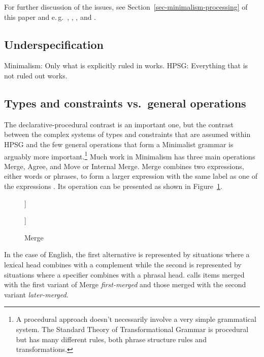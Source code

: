 \documentclass[output=paper]{langsci/langscibook}
\begin{document}
For further discussion of the issues, see Section~\ref{sec-minimalism-processing} of
this paper and e.\,g.\ \citet{PS2001a}, \citet{Postal2003a}, \citeauthor{SW2011a}
\citeyearpar{SW2011a,SW2015a}, and .  

\subsection{Underspecification}

Minimalism: Only what is explicitly ruled in works. HPSG: Everything that is not ruled out
works.



\subsection{Types and constraints vs.\ general operations}

The declarative-procedural contrast is an important one, but the contrast between the complex
systems of types and constraints that are assumed within HPSG and the few general operations that
form a Minimalist grammar is arguably more important.\footnote{%
  A procedural approach doesn't necessarily involve a very simple grammatical system. The Standard
  Theory of Transformational Grammar \citep{Chomsky65a} is procedural but has many different rules,
  both phrase structure rules and transformations.}
Much work in Minimalism has three main operations Merge, Agree, and Move or Internal Merge. Merge
combines two expressions, either words or phrases, to form a larger expression with the same label
as one of the expressions \parencites[244]{Chomsky95a-u}[]{Chomsky2008a}. Its operation can be presented as shown in Figure~\ref{fig:min-merge}.
\begin{figure}
\centering
	\raisebox{1\baselineskip}{X, Y $\Rightarrow$}
	\hspace{1em}
	\begin{forest}
		[X [X] [Y]]
	\end{forest}
\hspace{1em}
\raisebox{1\baselineskip}{or}
\hspace{1em}
	\begin{forest}
		[Y [X] [Y]]
	\end{forest}
	\caption{\label{fig:min-merge}Merge}
\end{figure}
In the case of English, the first alternative is represented by situations where a lexical head
combines with a complement while the second is represented by situations where a specifier combines
with a phrasal head. \citet[]{Chomsky2008a} calls items merged with the first variant of Merge \emph{first-merged}
and those merged with the second variant \emph{later-merged}.
\end{document}
